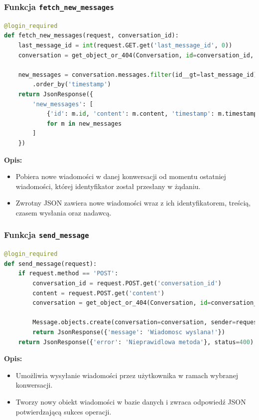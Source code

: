 \documentclass[12pt,a4paper,oneside]{article}
\theoremstyle{definition}
\numberwithin{equation}{section}
\begin{document}
\subsubsection{Funkcja \texttt{fetch\_new\_messages}}
\begin{lstlisting}[language=Python, caption=Kod funkcji \texttt{fetch\_new\_messages}]
@login_required
def fetch_new_messages(request, conversation_id):
    last_message_id = int(request.GET.get('last_message_id', 0))
    conversation = get_object_or_404(Conversation, id=conversation_id, participants=request.user)

    new_messages = conversation.messages.filter(id__gt=last_message_id)
        .order_by('timestamp')
    return JsonResponse({
        'new_messages': [
            {'id': m.id, 'content': m.content, 'timestamp': m.timestamp.strftime('%H:%M'), 'sender': m.sender.username}
            for m in new_messages
        ]
    })
\end{lstlisting}
\textbf{Opis:}
\begin{itemize}
    \item Pobiera nowe wiadomości w danej konwersacji od momentu ostatniej wiadomości, której identyfikator został przesłany w żądaniu.
    \item Zwrotny JSON zawiera nowe wiadomości wraz z ich identyfikatorem, treścią, czasem wysłania oraz nadawcą.
\end{itemize}



\subsubsection*{Funkcja \texttt{send\_message}}
\begin{lstlisting}[language=Python, caption=Kod funkcji \texttt{send\_message}]
@login_required
def send_message(request):
    if request.method == 'POST':
        conversation_id = request.POST.get('conversation_id')
        content = request.POST.get('content')
        conversation = get_object_or_404(Conversation, id=conversation_id, participants=request.user)

        Message.objects.create(conversation=conversation, sender=request.user, content=content.strip())
        return JsonResponse({'message': 'Wiadomosc wyslana!'})
    return JsonResponse({'error': 'Nieprawidlowa metoda'}, status=400)
\end{lstlisting}
\textbf{Opis:}
\begin{itemize}
    \item Umożliwia wysyłanie wiadomości przez użytkownika w ramach wybranej konwersacji.
    \item Tworzy nowy obiekt wiadomości w bazie danych i zwraca odpowiedź JSON potwierdzającą sukces operacji.
\end{itemize}
\end{document}
